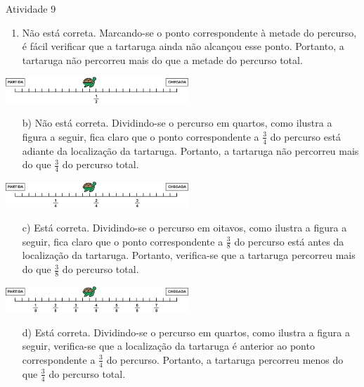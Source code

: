 \begin{multicols}{2}
\begin{resposta*}{Atividade 9}
\begin{enumerate} [\quad a)] %
  \item     Não está correta. Marcando-se o ponto correspondente à metade do percurso, é fácil verificar que a tartaruga ainda não alcançou esse ponto. Portanto, a tartaruga não percorreu mais do que a metade do percurso total.          

\end{enumerate}

 \includegraphics[width=195pt, keepaspectratio]{..//media/cap3/secoes/png/ativ9_resp_a}

\begin{enumerate} [\quad a)] %
\item[b)]     Não está correta. Dividindo-se o percurso em quartos, como ilustra a figura a seguir, fica claro que o ponto correspondente a     $\frac{3}{4}$     do percurso está adiante da localização da tartaruga. Portanto, a tartaruga não percorreu mais do que     $\frac{3}{4}$     do percurso total.          

\end{enumerate}

 \includegraphics[width=195pt, keepaspectratio]{..//media/cap3/secoes/png/ativ9_resp_b}

\begin{enumerate} [\quad a)] %


  \item[c)]     Está correta. Dividindo-se o percurso em oitavos, como ilustra a figura a seguir, fica claro que o ponto correspondente a     $\frac{3}{8}$     do percurso está antes da localização da tartaruga. Portanto, verifica-se que a tartaruga percorreu mais do que     $\frac{3}{8}$     do percurso total.          
\end{enumerate}

 \includegraphics[width=195pt, keepaspectratio]{..//media/cap3/secoes/png/ativ9_resp_c}

\begin{enumerate} [\quad a)] %
  \item[d)]     Está correta. Dividindo-se o percurso em quartos, como ilustra a figura a seguir, verifica-se que a localização da tartaruga é anterior ao ponto correspondente a     $\frac{3}{4}$     do percurso. Portanto, a tartaruga percorreu menos do que     $\frac{3}{4}$     do percurso total.         
\end{enumerate}


\end{resposta*}
\end{multicols}
